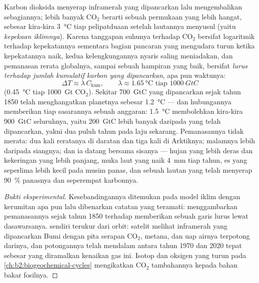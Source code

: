 \begin{proposition}\label{prop:b2:global-change:tcre}
%
Karbon dioksida menyerap inframerah yang dipancarkan  lalu
mengembalikan sebagiannya; lebih banyak \ensuremath{\mathrm{CO_2}} berarti sebuah
permukaan yang lebih hangat, sebesar kira-kira \qty{3}{\celsius} tiap
pelipatduaan setelah lautannya menyusul (yaitu \emph{kepekaan
iklimnya}). Karena tanggapan suhunya terhadap \ensuremath{\mathrm{CO_2}} bersifat
logaritmik terhadap kepekatannya sementara bagian pancaran yang
mengudara turun ketika kepekatannya naik, kedua kelengkungannya nyaris
saling meniadakan, dan pemanasan rerata globalnya, sampai sebuah
hampiran yang baik, bersifat \emph{lurus terhadap jumlah kumulatif
karbon yang dipancarkan}, apa pun waktunya:
\[
\Delta T \approx \lambda\,C_{\text{kum}}, \qquad \lambda \approx
\qty{1.65}{\celsius} \text{ tiap } \qty{1000}{GtC}
\]
(\qty{0.45}{\celsius} tiap \qty{1000}{Gt} \ensuremath{\mathrm{CO_2}}). Sekitar
\qty{700}{GtC} yang dipancarkan sejak tahun 1850 telah menghangatkan
planetnya sebesar \qty{1.2}{\celsius} --- dan hubungannya memberikan
tiap sasarannya sebuah anggaran: \qty{1.5}{\celsius} membolehkan
kira-kira \qty{900}{GtC} seluruhnya, yaitu \qty{200}{GtC} lebih banyak
daripada yang telah dipancarkan, yakni dua puluh tahun pada laju
sekarang. Pemanasannya tidak merata: dua kali reratanya di daratan dan
tiga kali di Arktiknya; malamnya lebih daripada siangnya; dan ia datang
bersama sisanya --- hujan yang lebih deras dan kekeringan yang lebih
panjang, muka laut yang naik \qty{4}{mm} tiap tahun, es yang seperlima
lebih kecil pada musim panas, dan sebuah lautan yang telah menyerap
\qty{90}{\%} panasnya dan seperempat karbonnya.
\end{proposition}
\begin{proof}[Bukti eksperimental]
Kesebandingannya ditemukan pada model iklim dengan kerumitan apa pun
lalu dibenarkan catatan yang teramati: menggambarkan pemanasannya sejak
tahun 1850 terhadap  memberikan sebuah garis lurus
lewat dasawarsanya.  sendiri terukur dari orbit:
satelit melihat inframerah yang dipancarkan Bumi dengan pita serapan
\ensuremath{\mathrm{CO_2}}, metana, dan uap airnya terpotong darinya, dan potongannya
telah mendalam antara tahun 1970 dan 2020 tepat sebesar yang diramalkan
kenaikan gas ini. Isotop dan oksigen yang turun pada
\cref{ch:b2:biogeochemical-cycles} mengikatkan \ensuremath{\mathrm{CO_2}} tambahannya
kepada bahan bakar fosilnya.
\end{proof}

